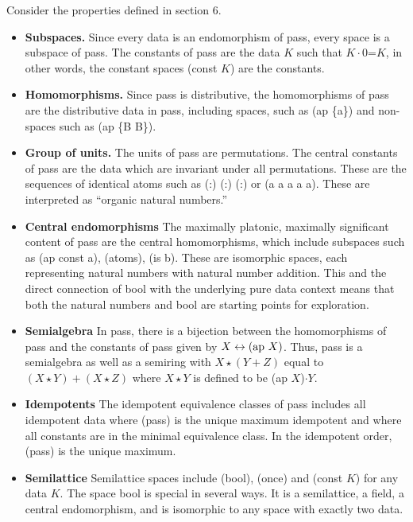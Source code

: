 \documentclass[11pt]{article}
\begin{document}
Consider the properties defined in section 6.  
\begin{itemize}
\item{{\bf Subspaces.}  Since every data is an endomorphism of pass, every space is a subspace of pass.  The constants of pass are the data $K$ such that 
$K\cdot 0$=$K$, in other words, the constant spaces (const $K$) are the constants.}
\item{{\bf Homomorphisms.} Since pass is distributive, the homomorphisms of pass are the distributive data in pass, including spaces, such as (ap \{a\}) 
and non-spaces such as (ap \{B B\}).} 
\item{{\bf Group of units.} The units of pass are permutations.  The central constants of pass are the data which 
are invariant under all permutations.  These are the sequences of identical atoms such as (:) (:) (:) or (a a a a a).  These are interpreted as ``organic natural numbers.''}
\item{{\bf Central endomorphisms} The maximally platonic, maximally significant content of pass are the central homomorphisms, which include 
subspaces such as (ap const a), (atoms), (is b).  These are isomorphic spaces, each representing natural numbers with natural number 
addition.  This and the direct connection of bool with the underlying pure data context means that 
both the natural numbers and bool are starting points for exploration.} 
\item{{\bf Semialgebra} In pass, there is a bijection between the homomorphisms of pass and the constants of pass given by $X\leftrightarrow ({\rm ap}\ X)$.  Thus,
pass is a semialgebra as well as a semiring with $X\star (Y+Z)$ equal to $(X\star Y)+(X\star Z)$ where $X\star Y$ is defined to be (ap $X$)$\cdot Y$.}
\item{{\bf Idempotents} The idempotent equivalence classes of pass includes all idempotent data where (pass) is the unique maximum idempotent and where all constants are in the minimal equivalence class.  In the idempotent order, (pass) is the unique maximum.}
\item{{\bf Semilattice} Semilattice spaces include (bool), (once) and (const $K$) for any data $K$.  The space bool is special in several ways.  
It is a semilattice, a field, a central endomorphism, and is isomorphic to any space with exactly two data.}
\end{itemize}
\end{document}
